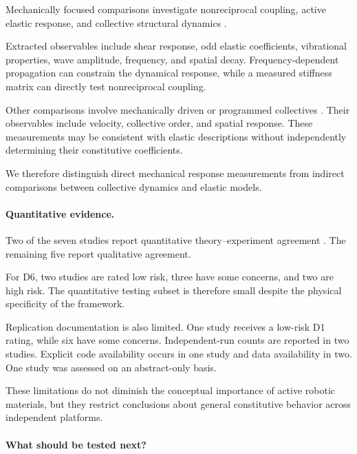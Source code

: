 Mechanically focused comparisons
investigate nonreciprocal coupling,
active elastic response, and
collective structural dynamics
\cite{Brandenbourger2021limitcyclesturnac,Binysh2026moreislessinunpe,Coulais2025activemetamaterials,Chen2020selfsensingmetamat}.

Extracted observables include
shear response, odd elastic
coefficients, vibrational properties,
wave amplitude, frequency,
and spatial decay. Frequency-dependent
propagation can constrain the dynamical
response, while a measured stiffness
matrix can directly test
nonreciprocal coupling.

Other comparisons involve mechanically
driven or programmed collectives
\cite{Mohanty2025multimodalmotionan,nr2022mindthegappredic,Karagzel2024selforganizedflock}.
Their observables include velocity,
collective order, and spatial response.
These measurements may be consistent
with elastic descriptions without
independently determining their
constitutive coefficients.

We therefore distinguish direct
mechanical response measurements
from indirect comparisons between
collective dynamics and elastic models.

\paragraph*{Quantitative evidence.}

Two of the seven studies report
quantitative theory--experiment agreement
\cite{Brandenbourger2021limitcyclesturnac,Chen2020selfsensingmetamat}.
The remaining five report
qualitative agreement.

For D6, two studies are rated
low risk, three have some concerns,
and two are high risk.
The quantitative testing subset
is therefore small despite the
physical specificity of the framework.

Replication documentation is also
limited. One study receives a
low-risk D1 rating, while six
have some concerns. Independent-run
counts are reported in two studies.
Explicit code availability occurs
in one study and data availability
in two. One study was assessed
on an abstract-only basis.

These limitations do not diminish
the conceptual importance of
active robotic materials, but
they restrict conclusions about
general constitutive behavior
across independent platforms.

\paragraph*{What should be tested next?}

